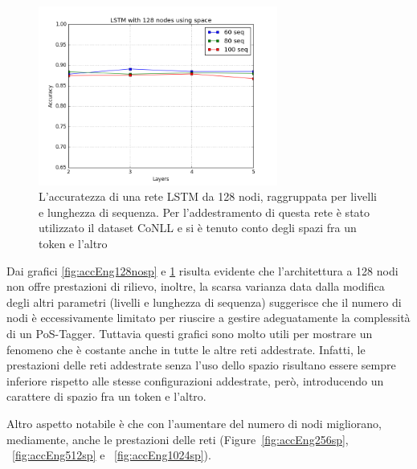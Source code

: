 \begin{figure}[H]
  \centering
  \begin{center}
    \includegraphics[width=0.7\textwidth]{./images/plots/english/accuracy_128n_word_min_loss_using_spaces.png}
  \end{center}
  \caption{L'accuratezza di una rete LSTM da 128 nodi, raggruppata per livelli e
          lunghezza di sequenza. Per l'addestramento di questa rete \`e stato
          utilizzato il dataset CoNLL e si \`e tenuto conto degli spazi fra un
          token e l'altro}
  \label{fig:accEng128sp}
\end{figure}

Dai grafici \ref{fig:accEng128nosp} e \ref{fig:accEng128sp} risulta evidente che
l'architettura a 128 nodi non offre prestazioni di rilievo, inoltre, la scarsa
varianza data dalla modifica degli altri parametri (livelli e lunghezza di sequenza)
suggerisce che il numero di nodi \`e eccessivamente limitato per riuscire a
gestire adeguatamente la complessit\`a di un PoS-Tagger. Tuttavia questi grafici
sono molto utili per mostrare un fenomeno che \`e costante anche in tutte le altre
reti addestrate. Infatti, le prestazioni delle reti addestrate senza l'uso dello
spazio risultano essere sempre inferiore rispetto alle stesse configurazioni
addestrate, per\`o, introducendo un carattere di spazio fra un token e l'altro.

Altro aspetto notabile \`e che con l'aumentare del numero di nodi migliorano,
mediamente, anche le prestazioni delle reti (Figure~\ref{fig:accEng256sp},
 ~\ref{fig:accEng512sp} e ~\ref{fig:accEng1024sp}).

